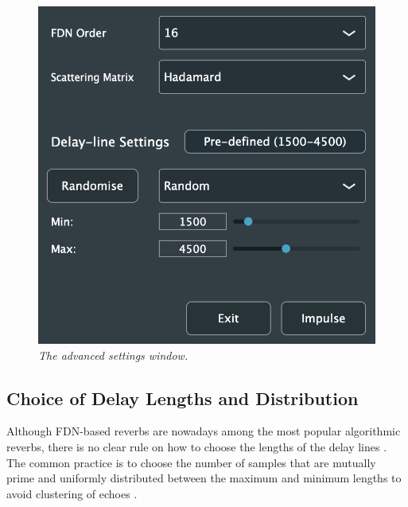 \documentclass[twoside,a4paper]{article}
\begin{document}


\begin{figure}[t!]

\centering
\includegraphics[width=0.8\columnwidth]{Figures/advancedSettings.png}
\caption{\textit{The advanced settings window.}}
\label{fig:advanced}
\end{figure}

\subsection{Choice of Delay Lengths and Distribution}

Although FDN-based reverbs are nowadays among the most popular algorithmic reverbs, there is no clear rule on how to choose the lengths of the delay lines \cite{Rocchesso:1997, schlecht:2016:echo}. The common practice is to choose the number of samples that are mutually prime and uniformly distributed between the maximum and minimum lengths to avoid clustering of echoes \cite{schlecht:2016:echo}. 
\end{document}
